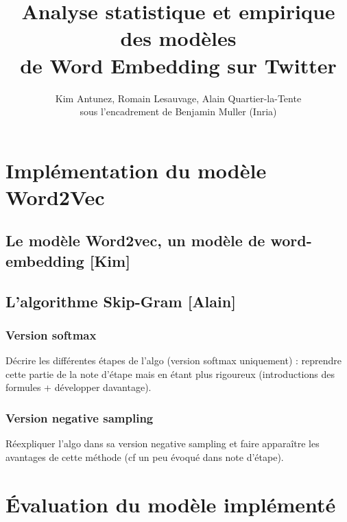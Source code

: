 \documentclass[11pt,french,french]{article}
\title{Analyse statistique et empirique des modèles\\
de Word Embedding sur Twitter}
\author{Kim Antunez, Romain Lesauvage, Alain Quartier-la-Tente\\
sous l'encadrement de Benjamin Muller (Inria)}
\date{}
\begin{document}
\maketitle


{
\hypersetup{linkcolor=black}
\setcounter{tocdepth}{3}
\tableofcontents
}
\hypertarget{sec:word2vec}{%
\section{Implémentation du modèle Word2Vec}\label{sec:word2vec}}

\hypertarget{le-moduxe8le-word2vec-un-moduxe8le-de-word-embedding-kim}{%
\subsection{Le modèle Word2vec, un modèle de word-embedding {[}Kim{]}}\label{le-moduxe8le-word2vec-un-moduxe8le-de-word-embedding-kim}}

\hypertarget{lalgorithme-skip-gram-alain}{%
\subsection{L'algorithme Skip-Gram {[}Alain{]}}\label{lalgorithme-skip-gram-alain}}

\hypertarget{version-softmax}{%
\subsubsection{Version softmax}\label{version-softmax}}

Décrire les différentes étapes de l'algo (version softmax uniquement) : reprendre cette partie de la note d'étape mais en étant plus rigoureux (introductions des formules + développer davantage).

\hypertarget{version-negative-sampling}{%
\subsubsection{Version negative sampling}\label{version-negative-sampling}}

Réexpliquer l'algo dans sa version negative sampling et faire apparaître les avantages de cette méthode (cf un peu évoqué dans note d'étape).

\hypertarget{uxe9valuation-du-moduxe8le-impluxe9mentuxe9}{%
\section{Évaluation du modèle implémenté}\label{uxe9valuation-du-moduxe8le-impluxe9mentuxe9}}
\end{document}
